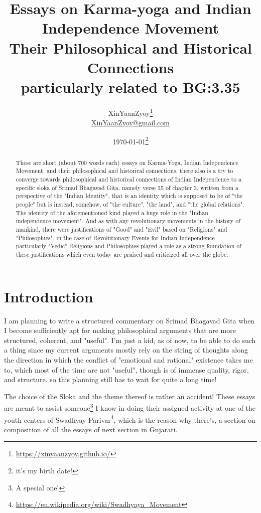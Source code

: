 \documentclass[a4paper]{article}
\title{Essays on Karma-yoga and Indian Independence Movement \\ 
\large Their Philosophical and Historical Connections \\ particularly related to BG:3.35}
\author{XinYaanZyoy\footnote{\href{https://xinyaanzyoy.github.io/}{https://xinyaanzyoy.github.io/}} \\ \href{mailto:XinYaanZyoy@gmail.com}{XinYaanZyoy@gmail.com}}
\date{\today\footnote{it's my birth date!}}
\begin{document}
\maketitle

\tableofcontents

\begin{abstract}
These are short (about 700 words each) essays on Karma-Yoga, Indian Independence Movement, 
and their philosophical and historical connections. there also is a try to converge towards 
philosophical and historical connections of Indian Independence to a specific sloka of Srimad Bhagavad Gita, 
namely verse 35 of chapter 3, written from a perspective of the "Indian Identity", that is an identity which is 
supposed to be of "the people" but is instead, somehow, of "the culture", "the land", and "the global relations". 
The identity of the aforementioned kind played a huge role in the "Indian independence movement". And as with any revolutionary 
movements in the history of mankind, there were justifications of "Good" and "Evil" based on "Religions" and "Philosophies", 
in the case of Revolutionary Events for Indian Independence particularly "Vedic" Religions and Philosophies played a role as 
a strong foundation of these justifications which even today are praised and criticized all over the globe.
\end{abstract}
    
\newpage
\section{Introduction}
I am planning to write a structured commentary on Srimad Bhagavad Gita when I become sufficiently apt for making philosophical 
arguments that are more structured, coherent, and "useful". I'm just a kid, as of now, to be able to do such a thing since my 
current arguments mostly rely on the string of thoughts along the direction in which the conflict of "emotional and rational" 
existence takes me to, which most of the time are not "useful", though is of immense quality, rigor, and structure. so this 
planning still has to wait for quite a long time!

The choice of the Sloka and the theme thereof is rather an accident! These essays are meant to assist someone\footnote{A special 
one!} I know in doing their assigned activity at one of the youth centers of Swadhyay Parivar\footnote{
\href{https://en.wikipedia.org/wiki/Swadhyaya\_Movement}{https://en.wikipedia.org/wiki/Swadhyaya\_Movement}}, 
which is the reason why there's, a section on composition of all the essays of next section in Gujarati.
\end{document}
